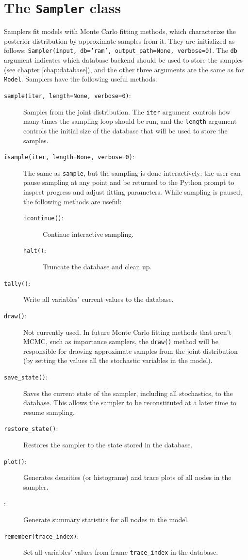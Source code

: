 \section{The \texttt{Sampler} class} 
Samplers fit models with Monte Carlo fitting methods, which characterize the posterior distribution by approximate samples from it. They are initialized as follows: \texttt{Sampler(input, db='ram', output\_path=None, verbose=0)}. The \texttt{db} argument indicates which database backend should be used to store the samples (see chapter \ref{chap:database}), and the other three arguments are the same as for \texttt{Model}. Samplers have the following useful methods:
\begin{description}
    \item[\texttt{sample(iter, length=None, verbose=0)}:] Samples from the joint distribution. The \texttt{iter} argument controls how many times the sampling loop should be run, and the \texttt{length} argument controls the initial size of the database that will be used to store the samples.
    \item[\texttt{isample(iter, length=None, verbose=0)}:] The same as \texttt{sample}, but the sampling is done interactively: the user can pause sampling at any point and be returned to the Python prompt to inspect progress and adjust fitting parameters. While sampling is paused, the following methods are useful: 
    \begin{description}
        \item[\texttt{icontinue()}:] Continue interactive sampling.
        \item[\texttt{halt()}:] Truncate the database and clean up.
    \end{description}
    \item[\texttt{tally()}:] Write all variables' current values to the database.
    \item[\texttt{draw()}:] Not currently used. In future Monte Carlo fitting methods that aren't MCMC, such as importance samplers, the \texttt{draw()} method will be responsible for drawing approximate samples from the joint distribution (by setting the values all the stochastic variables in the model).
    \item[\texttt{save\_state()}:] Saves the current state of the sampler, including all stochastics, to the database. This allows the sampler to be reconstituted at a later time to resume sampling.
    \item[\texttt{restore\_state()}:] Restores the sampler to the state stored in the database.
    \item[\texttt{plot()}:] Generates densities (or histograms) and trace plots of all nodes in the sampler.
	 \item[:] Generate summary statistics for all nodes in the model.
    \item[\texttt{remember(trace\_index)}:] Set all variables' values from frame \texttt{trace\_index} in the database.
\end{description}

